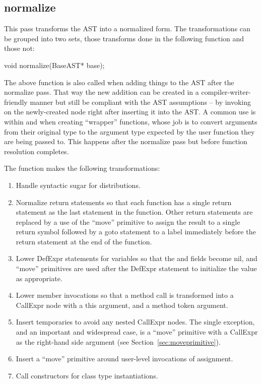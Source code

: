 \documentclass[10pt]{article}
\begin{document}
\subsection{normalize}

This pass transforms the AST into a normalized form.  The
transformations can be grouped into two sets, those transforms done in
the following function and those not:
\begin{clang}
void normalize(BaseAST* base);
\end{clang}
The above function is also called when adding things to the AST after
the normalize pass.  That way the new addition can be created in a
compiler-writer-friendly manner but still be compliant with the AST
assumptions -- by invoking  on the newly-created node
right after inserting it into the AST.  A common use is within
 and when creating ``wrapper'' functions,
whose job is to convert arguments from their original type to the
argument type expected by the user function they are being passed to.
This happens after the normalize pass but before function resolution
completes.

The  function makes the following transformations:
\begin{enumerate}
\item Handle syntactic sugar for distributions.
\item Normalize return statements so that each function has a single
  return statement as the last statement in the function.  Other
  return statements are replaced by a use of the ``move'' primitive to
  assign the result to a single return symbol followed by a goto
  statement to a label immediately before the return statement at the
  end of the function.
\item Lower DefExpr statements for variables so that the  and
   fields become nil, and ``move'' primitives are used
  after the DefExpr statement to initialize the value as appropriate.
\item Lower member invocations so that a method call is transformed
  into a CallExpr node with a this argument, and a method token
  argument.
\item Insert temporaries to avoid any nested CallExpr nodes.  The
  single exception, and an important and widespread case, is a
  ``move'' primitive with a CallExpr as the right-hand side argument
  (see Section~\ref{sec:moveprimitive}).
\item Insert a ``move'' primitive around user-level invocations of
  assignment.
\item Call constructors for class type instantiations.
\end{enumerate}
\end{document}
